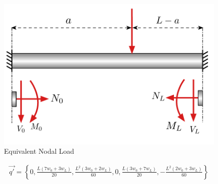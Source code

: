 \begin{figure}[h]	
	\centerline{
		\includegraphics[width=0.5\columnwidth]{Figures/EqPointLoad}
		}
	\caption{Equivalent Nodal Load}
	\label{fig:EqPointLoad}
\end{figure}

\begin{align}
	\vec{q'} = \left\{ 
	0,
	\frac{L(7w_0+3w_L)}{20},
	\frac{L^2(3w_0+2w_L)}{60},
	0,
	\frac{L(3w_0+7w_L)}{20},
	-\frac{L^2(2w_0+3w_L)}{60}
	\right\}
\end{align}



